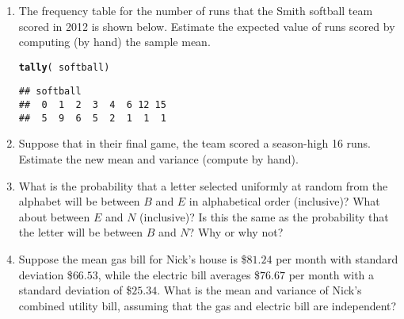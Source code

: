 \documentclass[10pt]{article}\usepackage[]{graphicx}\usepackage[]{color}
\makeatletter
\newcommand{\hlopt}[1]{\textcolor[rgb]{0,0,0}{#1}}%
\newcommand{\hlstd}[1]{\textcolor[rgb]{0.345,0.345,0.345}{#1}}%
\newcommand{\hlkwd}[1]{\textcolor[rgb]{0.737,0.353,0.396}{\textbf{#1}}}%
\newenvironment{kframe}{%
 \def\at@end@of@kframe{}%
 \ifinner\ifhmode%
  \def\at@end@of@kframe{\end{minipage}}%
  \begin{minipage}{\columnwidth}%
 \fi\fi%
 \def\FrameCommand##1{\hskip\@totalleftmargin \hskip-\fboxsep
 \colorbox{shadecolor}{##1}\hskip-\fboxsep
     \hskip-\linewidth \hskip-\@totalleftmargin \hskip\columnwidth}%
 \MakeFramed {\advance\hsize-\width
   \@totalleftmargin\z@ \linewidth\hsize
   \@setminipage}}%
 {\par\unskip\endMakeFramed%
 \at@end@of@kframe}
\newenvironment{knitrout}{}{} %
\makeatother
\begin{document}
\begin{enumerate}
  \item The frequency table for the number of runs that the Smith softball team scored in 2012 is shown below. Estimate the expected value of runs scored by computing (by hand) the sample mean.
\begin{knitrout}\footnotesize
{}\color{fgcolor}\begin{kframe}
\begin{alltt}
\hlkwd{tally}\hlstd{(}\hlopt{~}\hlstd{softball)}
\end{alltt}
\begin{verbatim}
## softball
##  0  1  2  3  4  6 12 15 
##  5  9  6  5  2  1  1  1
\end{verbatim}
\end{kframe}
\end{knitrout}
  \item Suppose that in their final game, the team scored a season-high 16 runs. Estimate the new mean and variance (compute by hand). 
  \item What is the probability that a letter selected uniformly at random from the alphabet will be between $B$ and $E$ in alphabetical order (inclusive)? What about between $E$ and $N$ (inclusive)? Is this the same as the probability that the letter will be between $B$ and $N$? Why or why not?
  \item Suppose the mean gas bill for Nick's house is \$$81.24$ per month with standard deviation \$$66.53$, while the electric bill averages \$$76.67$ per month with a standard deviation of \$$25.34$. What is the mean and variance of Nick's combined utility bill, assuming that the gas and electric bill are independent? 
\end{enumerate}
\end{document}
